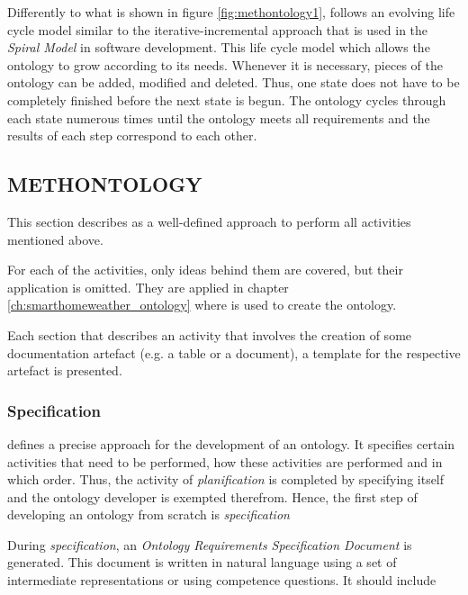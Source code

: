 Differently to what is shown in figure \ref{fig:methontology1}, \methontology follows an evolving life cycle model similar to the iterative-incremental approach that is used in the \emph{Spiral Model} in software development\cite{spiral_model}. This life cycle model which allows the ontology to grow according to its needs. Whenever it is necessary, pieces of the ontology can be added, modified and deleted. Thus, one state does not have to be completely finished before the next state is begun. The ontology cycles through each state numerous times until the ontology meets all requirements and the results of each step correspond to each other.

\subsection{METHONTOLOGY}
\label{sec:methontology}

This section describes \methontology as a well-defined approach to perform all activities mentioned above.

For each of the activities, only ideas behind them are covered, but their application is omitted. They are applied in chapter \ref{ch:smarthomeweather_ontology} where \methontology is used to create the \smarthomeweather ontology.

Each section that describes an activity that involves the creation of some documentation artefact (e.g. a table or a document), a template for the respective artefact is presented.

\subsubsection{Specification}
\label{subsec:methontology_specification}

\methontology defines a precise approach for the development of an ontology. It specifies certain activities that need to be performed, how these activities are performed and in which order. Thus, the activity of \emph{planification} is completed by specifying \methontology itself and the ontology developer is exempted therefrom. Hence, the first step of developing an ontology from scratch is \emph{specification}

During \emph{specification}, an \emph{Ontology Requirements Specification Document} is generated. This document is written in natural language using a set of intermediate representations or using competence questions. It should include

